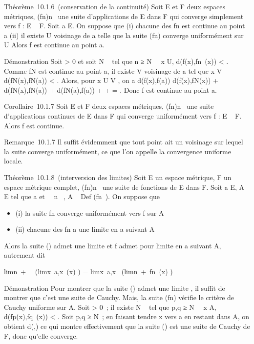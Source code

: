 Théorème~10.1.6~(conservation de la continuité) Soit E et F deux espaces
métriques, (fn)n\in{}~ une suite d'applications de E
dans F qui converge simplement vers f : E \rightarrow~ F. Soit a \in E. On suppose
que (i) chacune des fn est continue au point a (ii) il existe
U voisinage de a telle que la suite (fn) converge uniformément
sur U Alors f est continue au point a.

Démonstration Soit \epsilon \textgreater{} 0 et soit N \in {}~ tel que n ≥ N
\rigtharrow~\forall~x \in U, d(f(x),fn~(x)) \textless{}
\epsilon {} . Comme fN est continue au point a,
il existe V voisinage de a tel que x \in V \rigtharrow~
d(fN(x),fN(a)) \textless{} \epsilon {} . Alors, pour x \in U \bigcap V , on a d(f(x),f(a)) \leq
d(f(x),fN(x)) + d(fN(x),fN(a)) +
d(fN(a),f(a)) \leq \epsilon {} + \epsilon
{} + \epsilon {} = \epsilon. Donc f est
continue au point a.

Corollaire~10.1.7 Soit E et F deux espaces métriques,
(fn)n\in{}~ une suite d'applications continues de E dans
F qui converge uniformément vers f : E \rightarrow~ F. Alors f est continue.

Remarque~10.1.7 Il suffit évidemment que tout point ait un voisinage sur
lequel la suite converge uniformément, ce que l'on appelle la
convergence uniforme locale.

Théorème~10.1.8~(interversion des limites) Soit E un espace métrique, F
un espace métrique complet, (fn)n\in{}~ une suite de
fonctions de E dans F. Soit a \in E, A \subset~ E tel que a
\in\overlineA et \forall~~n \in {}~, A
\subset~ Def (fn~). On suppose que

\begin{itemize}
\itemsep1pt\parskip0pt
\item
  (i) la suite fn converge uniformément vers f sur A
\item
  (ii) chacune des fn a une limite \elln en a suivant A
\end{itemize}

Alors la suite (\elln) admet une limite \ell et f admet \ell pour
limite en a suivant A, autrement dit

limn\rightarrow~+\infty~~\left
(limx\rightarrow~a,x\inAfn~(x)\right
) = limx\rightarrow~a,x\inA~\left
(limn\rightarrow~+\infty~fn~(x)\right
)

Démonstration Pour montrer que la suite (\elln) admet une limite
\ell, il suffit de montrer que c'est une suite de Cauchy. Mais, la suite
(fn) vérifie le critère de Cauchy uniforme sur A. Soit \epsilon
\textgreater{} 0~; il existe N \in {}~ tel que p,q ≥ N
\rigtharrow~\forall~x \in A, d(fp(x),fq~(x))
\textless{} \epsilon. Soit p,q ≥ N~; en faisant tendre x vers a en restant dans
A, on obtient d(\ellp,\ellq) \leq \epsilon ce qui montre
effectivement que la suite (\elln) est une suite de Cauchy de F,
donc qu'elle converge.

